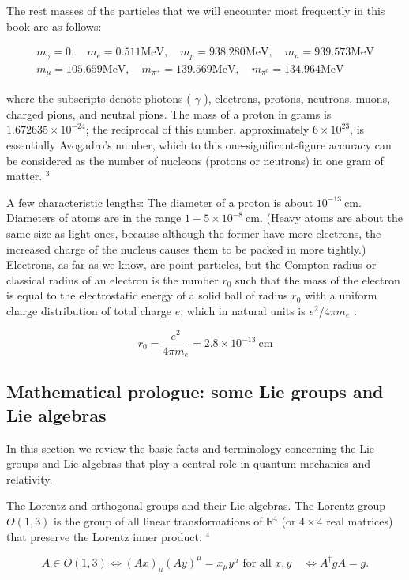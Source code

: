 \documentclass[10pt, letterpaper]{article}
\begin{document}
The rest masses of the particles that we will encounter most frequently in this book are as follows:

$$
\begin{gathered}
m_{\gamma}=0, \quad m_{e}=0.511 \mathrm{MeV}, \quad m_{p}=938.280 \mathrm{MeV}, \quad m_{n}=939.573 \mathrm{MeV} \\
m_{\mu}=105.659 \mathrm{MeV}, \quad m_{\pi^{ \pm}}=139.569 \mathrm{MeV}, \quad m_{\pi^{0}}=134.964 \mathrm{MeV}
\end{gathered}
$$

where the subscripts denote photons ( $\gamma$ ), electrons, protons, neutrons, muons, charged pions, and neutral pions. The mass of a proton in grams is $1.672635 \times 10^{-24}$; the reciprocal of this number, approximately $6 \times 10^{23}$, is essentially Avogadro's number, which to this one-significant-figure accuracy can be considered as the number of nucleons (protons or neutrons) in one gram of matter. ${ }^{3}$

A few characteristic lengths: The diameter of a proton is about $10^{-13} \mathrm{~cm}$. Diameters of atoms are in the range $1-5 \times 10^{-8} \mathrm{~cm}$. (Heavy atoms are about the same size as light ones, because although the former have more electrons, the increased charge of the nucleus causes them to be packed in more tightly.) Electrons, as far as we know, are point particles, but the Compton radius or classical radius of an electron is the number $r_{0}$ such that the mass of the electron is equal to the electrostatic energy of a solid ball of radius $r_{0}$ with a uniform charge distribution of total charge $e$, which in natural units is $e^{2} / 4 \pi m_{e}$ :

$$
r_{0}=\frac{e^{2}}{4 \pi m_{e}}=2.8 \times 10^{-13} \mathrm{~cm}
$$

\subsection*{Mathematical prologue: some Lie groups and Lie algebras}
In this section we review the basic facts and terminology concerning the Lie groups and Lie algebras that play a central role in quantum mechanics and relativity.

The Lorentz and orthogonal groups and their Lie algebras. The Lorentz group $O(1,3)$ is the group of all linear transformations of $\mathbb{R}^{4}$ (or $4 \times 4$ real matrices) that preserve the Lorentz inner product: ${ }^{4}$

$$
A \in O(1,3) \Longleftrightarrow(A x)_{\mu}(A y)^{\mu}=x_{\mu} y^{\mu} \text { for all } x, y \quad \Longleftrightarrow A^{\dagger} g A=g .
$$
\end{document}
